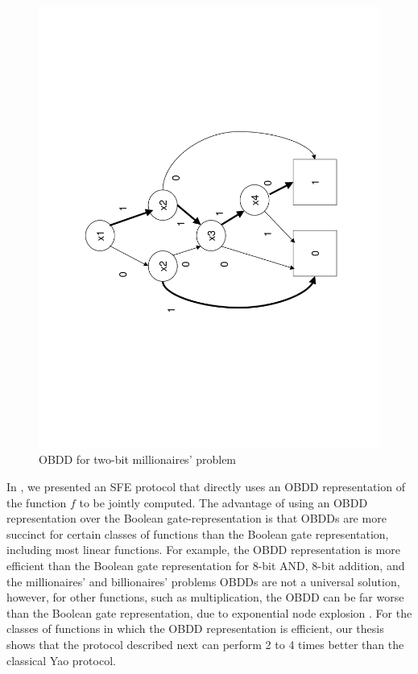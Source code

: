 %
\begin{figure}
\begin{centering}
\includegraphics[scale=0.4,angle=270]{chapters/obdd1} 
\par\end{centering}

\caption{\label{fig:OBDD-example}OBDD for two-bit millionaires' problem}

\end{figure}


In \cite{kruger06}, we presented an SFE protocol that directly uses
an OBDD representation of the function $f$ to be jointly computed.
The advantage of using an OBDD representation over the Boolean gate-representation
is that OBDDs are more succinct for certain classes of functions than
the Boolean gate representation, including most linear functions.
For example, the OBDD representation is more efficient than the Boolean
gate representation for 8-bit AND, 8-bit addition, and the millionaires'
and billionaires' problems \cite{Yao86} OBDDs are not a universal
solution, however, for other functions, such as multiplication, the
OBDD can be far worse than the Boolean gate representation, due to
exponential node explosion \cite{Bryant:BDD}. For the classes of
functions in which the OBDD representation is efficient, our thesis
\cite{kruger06} shows that the protocol described next can perform
2 to 4 times better than the classical Yao protocol.

